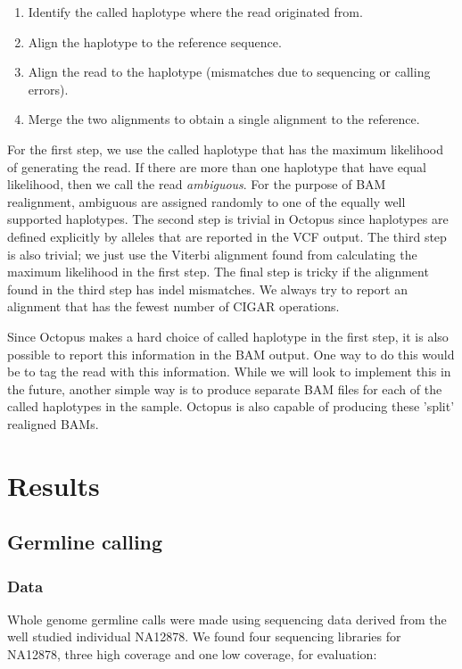 \documentclass{article}
\begin{document}
\begin{enumerate}
	\item Identify the called haplotype where the read originated from.
	\item Align the haplotype to the reference sequence.
	\item Align the read to the haplotype (mismatches due to sequencing or calling errors).
	\item Merge the two alignments to obtain a single alignment to the reference.
\end{enumerate}

For the first step, we use the called haplotype that has the maximum likelihood of generating the read. If there are more than one haplotype that have equal likelihood, then we call the read \emph{ambiguous}. For the purpose of BAM realignment, ambiguous are assigned randomly to one of the equally well supported haplotypes. The second step is trivial in Octopus since haplotypes are defined explicitly by alleles that are reported in the VCF output. The third step is also trivial; we just use the Viterbi alignment found from calculating the maximum likelihood in the first step. The final step is tricky if the alignment found in the third step has indel mismatches. We always try to report an alignment that has the fewest number of CIGAR operations.

Since Octopus makes a hard choice of called haplotype in the first step, it is also possible to report this information in the BAM output. One way to do this would be to tag the read with this information. While we will look to implement this in the future, another simple way is to produce separate BAM files for each of the called haplotypes in the sample. Octopus is also capable of producing these 'split' realigned BAMs.

\section{Results}

\subsection{Germline calling}

\subsubsection{Data}

Whole genome germline calls were made using sequencing data derived from the well studied individual NA12878. We found four sequencing libraries for NA12878, three high coverage and one low coverage, for evaluation:
\end{document}
